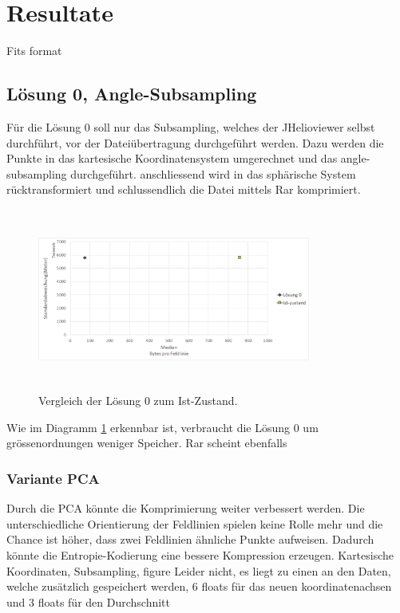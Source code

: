 \section{Resultate}\label{resultate}

Fits format

\subsection{Lösung 0, Angle-Subsampling}
Für die Lösung 0 soll nur das Subsampling, welches der JHelioviewer selbst durchführt, vor der Dateiübertragung durchgeführt werden. Dazu werden die Punkte in das kartesische Koordinatensystem umgerechnet und das angle-subsampling durchgeführt. anschliessend wird in das sphärische System rücktransformiert und schlussendlich die Datei mittels Rar komprimiert.
\begin{figure}[!htbp]
	\center
	\includegraphics[width=0.8\textwidth,height=6cm,keepaspectratio]{./pictures/resultate/loesung0/loesung0_0.png}
	\caption{Vergleich der Lösung 0 zum Ist-Zustand.}
	\label{resultate:loesung0:loesung0_0}
\end{figure}
Wie im Diagramm \ref{resultate:loesung0:loesung0_0} erkennbar ist, verbraucht die Lösung 0 um grössenordnungen weniger Speicher. Rar scheint ebenfalls

\subsubsection{Variante PCA}
Durch die PCA könnte die Komprimierung weiter verbessert werden. Die unterschiedliche Orientierung der Feldlinien spielen keine Rolle mehr und die Chance ist höher, dass zwei Feldlinien ähnliche Punkte aufweisen. Dadurch könnte die Entropie-Kodierung eine bessere Kompression erzeugen.
Kartesische Koordinaten, Subsampling, 
figure
Leider nicht, es liegt zu einen an den Daten, welche zusätzlich gespeichert werden, 6 floats für das neuen koordinatenachsen und 3 floats für den Durchschnitt


